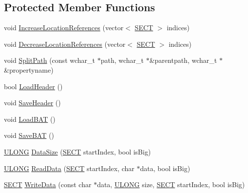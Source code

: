 \subsection*{Protected Member Functions}
\begin{DoxyCompactItemize}
\item 
void \hyperlink{class_y_compound_files_1_1_compound_file_a8f934ee505dddfce900b2a4310018183}{Increase\+Location\+References} (vector$<$ \hyperlink{_basic_excel_8hpp_a784c2e2144ab372c047faeeb0f6a9e6b}{S\+E\+C\+T} $>$ indices)
\item 
void \hyperlink{class_y_compound_files_1_1_compound_file_a0438368b927c0338bd659f49eb8987b9}{Decrease\+Location\+References} (vector$<$ \hyperlink{_basic_excel_8hpp_a784c2e2144ab372c047faeeb0f6a9e6b}{S\+E\+C\+T} $>$ indices)
\item 
void \hyperlink{class_y_compound_files_1_1_compound_file_a3be81d1a73f74793e3c92cb051e2c10c}{Split\+Path} (const wchar\+\_\+t $\ast$path, wchar\+\_\+t $\ast$\&parentpath, wchar\+\_\+t $\ast$\&propertyname)
\item 
bool \hyperlink{class_y_compound_files_1_1_compound_file_a83e08fdf3c056c2b7be476e16f0f9473}{Load\+Header} ()
\item 
void \hyperlink{class_y_compound_files_1_1_compound_file_a6bf0e1aa5c8f8444632e713312a2f38f}{Save\+Header} ()
\item 
void \hyperlink{class_y_compound_files_1_1_compound_file_a77153a3607417a2fd7ef84aab9193f2e}{Load\+B\+A\+T} ()
\item 
void \hyperlink{class_y_compound_files_1_1_compound_file_a6b79426b819e667dc0ba60b4969e9625}{Save\+B\+A\+T} ()
\item 
\hyperlink{_basic_excel_8hpp_abe09d1bea023be6a07cbadde8e955435}{U\+L\+O\+N\+G} \hyperlink{class_y_compound_files_1_1_compound_file_a25ac7b658490f049a29f29eaabe777bc}{Data\+Size} (\hyperlink{_basic_excel_8hpp_a784c2e2144ab372c047faeeb0f6a9e6b}{S\+E\+C\+T} start\+Index, bool is\+Big)
\item 
\hyperlink{_basic_excel_8hpp_abe09d1bea023be6a07cbadde8e955435}{U\+L\+O\+N\+G} \hyperlink{class_y_compound_files_1_1_compound_file_a824ee7496bc9e849cbacab7860011703}{Read\+Data} (\hyperlink{_basic_excel_8hpp_a784c2e2144ab372c047faeeb0f6a9e6b}{S\+E\+C\+T} start\+Index, char $\ast$data, bool is\+Big)
\item 
\hyperlink{_basic_excel_8hpp_a784c2e2144ab372c047faeeb0f6a9e6b}{S\+E\+C\+T} \hyperlink{class_y_compound_files_1_1_compound_file_affe7d3e13bf06566b99a248fea564edd}{Write\+Data} (const char $\ast$data, \hyperlink{_basic_excel_8hpp_abe09d1bea023be6a07cbadde8e955435}{U\+L\+O\+N\+G} size, \hyperlink{_basic_excel_8hpp_a784c2e2144ab372c047faeeb0f6a9e6b}{S\+E\+C\+T} start\+Index, bool is\+Big)

\end{DoxyCompactItemize}
